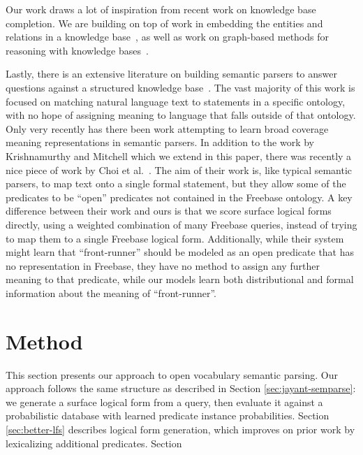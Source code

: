 \documentclass[11pt]{article}
\begin{document}
Our work draws a lot of inspiration from recent work on knowledge base
completion.  We are building on top of work in embedding the entities and
relations in a knowledge
base~\cite{riedel-2013-mf-universal-schema,nickel-2011-rescal,bordes-2013-transe},
as well as work on graph-based methods for reasoning with knowledge
bases~\cite{lao-2010-original-pra,gardner-2014-vector-space-pra,neelakantan-2015-rnn-kbc}.

Lastly, there is an extensive literature on building semantic parsers to answer
questions against a structured knowledge
base~\cite{zettlemoyer-2005-ccg,berant-2013-semantic-parsing-qa,%
kwiatkowski-2013-ontology-matching,krishnamurthy-2012-semantic-parsing}.  The
vast majority of this work is focused on matching natural language text to
statements in a specific ontology, with no hope of assigning meaning to
language that falls outside of that ontology.  Only very recently has there
been work attempting to learn broad coverage meaning representations in
semantic parsers.  In addition to the work by Krishnamurthy and Mitchell which
we extend in this paper, there was recently a nice piece of work by Choi et
al.~.  The aim of
their work is, like typical semantic parsers, to map text onto a single formal
statement, but they allow some of the predicates to be ``open'' predicates not
contained in the Freebase ontology.  A key difference between their work and
ours is that we score surface logical forms directly, using a weighted
combination of many Freebase queries, instead of trying to map them to a single
Freebase logical form.  Additionally, while their system might learn that
``front-runner'' should be modeled as an open predicate that has no
representation in Freebase, they have no method to assign any further meaning
to that predicate, while our models learn both distributional and formal
information about the meaning of ``front-runner''.

\section{Method}
\label{sec:method}

This section presents our approach to open vocabulary semantic
parsing. Our approach follows the same structure as described in
Section \ref{sec:jayant-semparse}: we generate a surface logical form
from a query, then evaluate it against a probabilistic database with
learned predicate instance probabilities.  Section
\ref{sec:better-lfs} describes logical form generation, which improves
on prior work by lexicalizing additional predicates. Section 
\end{document}
